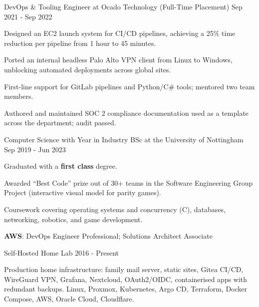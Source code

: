 \documentclass[10pt, a4paper]{awesome-cv}
\begin{document}
    \cventry
    {DevOps \& Tooling Engineer at Ocado Technology (Full-Time Placement)}
    {Sep 2021 - Sep 2022}

    \begin{cvitems}
        \item Designed an EC2 launch system for CI/CD pipelines, achieving a 25\% time reduction per pipeline from 1 hour to 45 minutes.
        \item Ported an internal headless Palo Alto VPN client from Linux to Windows, unblocking automated deployments across global sites.
        \item First-line support for GitLab pipelines and Python/C\# tools; mentored two team members.
        \item Authored and maintained SOC 2 compliance documentation used as a template across the department; audit passed.
    \end{cvitems}


    \cventry
    {Computer Science with Year in Industry BSc at the University of Nottingham}
    {Sep 2019 - Jun 2023}

    \begin{cvitems}
        \item Graduated with a \textbf{first class} degree.
        \item Awarded ``Best Code'' prize out of 30+ teams in the Software Engineering Group Project (interactive visual model for parity games).
        \item Coursework covering operating systems and concurrency (C), databases, networking, robotics, and game development.
    \end{cvitems}

    \newpage

    \label{certs}

    \begin{cvitems}
        \item \textbf{AWS}: DevOps Engineer Professional; Solutions Architect Associate
    \end{cvitems}
    

    \cventry
    {Self-Hosted Home Lab}
    {2016 - Present}

    \begin{cvparagraph}
        Production home infrastructure: family mail server, static sites, Gitea CI/CD, WireGuard VPN, Grafana, Nextcloud, OAuth2/OIDC, containerised apps with redundant backups. Linux, Proxmox, Kubernetes, Argo CD, Terraform, Docker Compose, AWS, Oracle Cloud, Cloudflare.
    \end{cvparagraph}
\end{document}
